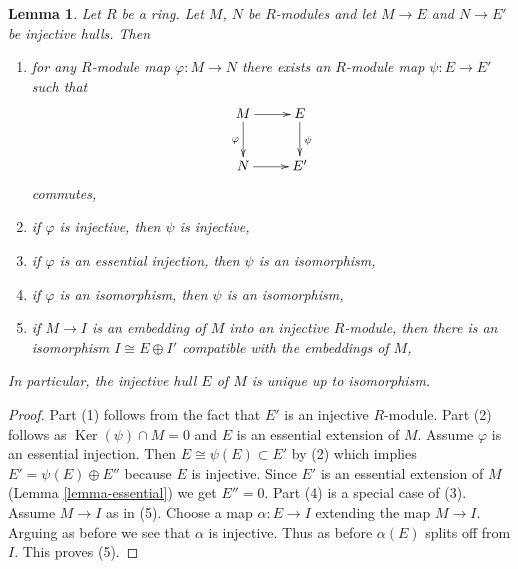 \documentclass[10pt,a4paper]{amsart}
\theoremstyle{plain}
\newtheorem{lemma}[subsection]{Lemma}
\theoremstyle{definition}
\theoremstyle{remark}
\numberwithin{equation}{subsection}
\def\Ker{\mathop{\mathrm{Ker}}}
\begin{document}
\begin{lemma}
\label{lemma-injective-hull-unique}
Let $R$ be a ring. Let $M$, $N$ be $R$-modules and let $M \to E$
and $N \to E'$ be injective hulls. Then
\begin{enumerate}
\item for any $R$-module map $\varphi : M \to N$ there exists an
$R$-module map $\psi : E \to E'$ such that
$$
\xymatrix{
M \ar[r] \ar[d]_\varphi & E \ar[d]^\psi \\
N \ar[r] & E'
}
$$
commutes,
\item if $\varphi$ is injective, then $\psi$ is injective,
\item if $\varphi$ is an essential injection, then $\psi$ is an isomorphism,
\item if $\varphi$ is an isomorphism, then $\psi$ is an isomorphism,
\item if $M \to I$ is an embedding of $M$ into an injective $R$-module,
then there is an isomorphism $I \cong E \oplus I'$ compatible with
the embeddings of $M$,
\end{enumerate}
In particular, the injective hull $E$ of $M$ is unique up to isomorphism.
\end{lemma}

\begin{proof}
Part (1) follows from the fact that $E'$ is an injective $R$-module.
Part (2) follows as $\Ker(\psi) \cap M = 0$
and $E$ is an essential extension of $M$.
Assume $\varphi$ is an essential injection. Then
$E \cong \psi(E) \subset E'$ by (2) which implies
$E' = \psi(E) \oplus E''$ because $E$ is injective.
Since $E'$ is an essential extension of
$M$ (Lemma \ref{lemma-essential}) we get $E'' = 0$.
Part (4) is a special case of (3).
Assume $M \to I$ as in (5).
Choose a map $\alpha : E \to I$ extending the map $M \to I$.
Arguing as before we see that $\alpha$ is injective.
Thus as before $\alpha(E)$ splits off from $I$.
This proves (5).
\end{proof}
\end{document}
